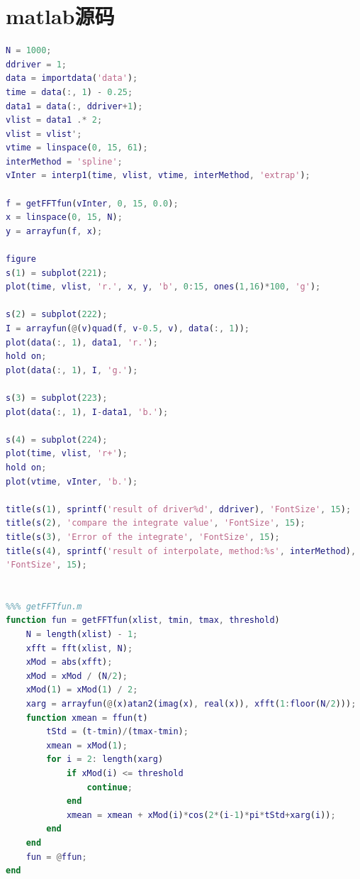 \documentclass[bwprint]{cumcmthesis}
\begin{document}
        \section{matlab源码}
        \begin{lstlisting}[language=matlab]
%%% main.m
N = 1000;
ddriver = 1;
data = importdata('data');
time = data(:, 1) - 0.25;
data1 = data(:, ddriver+1);
vlist = data1 .* 2;
vlist = vlist';
vtime = linspace(0, 15, 61);
interMethod = 'spline';
vInter = interp1(time, vlist, vtime, interMethod, 'extrap');

f = getFFTfun(vInter, 0, 15, 0.0);
x = linspace(0, 15, N);
y = arrayfun(f, x);

figure
s(1) = subplot(221);
plot(time, vlist, 'r.', x, y, 'b', 0:15, ones(1,16)*100, 'g');

s(2) = subplot(222);
I = arrayfun(@(v)quad(f, v-0.5, v), data(:, 1));
plot(data(:, 1), data1, 'r.');
hold on;
plot(data(:, 1), I, 'g.');

s(3) = subplot(223);
plot(data(:, 1), I-data1, 'b.');

s(4) = subplot(224);
plot(time, vlist, 'r+');
hold on;
plot(vtime, vInter, 'b.');

title(s(1), sprintf('result of driver%d', ddriver), 'FontSize', 15);
title(s(2), 'compare the integrate value', 'FontSize', 15);
title(s(3), 'Error of the integrate', 'FontSize', 15);
title(s(4), sprintf('result of interpolate, method:%s', interMethod), ... 
'FontSize', 15);


%%% getFFTfun.m
function fun = getFFTfun(xlist, tmin, tmax, threshold)
    N = length(xlist) - 1;
    xfft = fft(xlist, N);
    xMod = abs(xfft);
    xMod = xMod / (N/2);
    xMod(1) = xMod(1) / 2;
    xarg = arrayfun(@(x)atan2(imag(x), real(x)), xfft(1:floor(N/2)));
    function xmean = ffun(t)
        tStd = (t-tmin)/(tmax-tmin);
        xmean = xMod(1);
        for i = 2: length(xarg)
            if xMod(i) <= threshold
                continue;
            end
            xmean = xmean + xMod(i)*cos(2*(i-1)*pi*tStd+xarg(i));
        end
    end
    fun = @ffun;
end

        \end{lstlisting}
\end{document}
